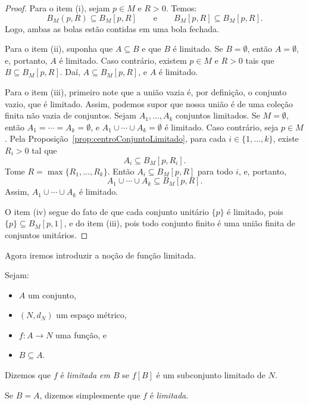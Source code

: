 \begin{proof}
    Para o item (i), sejam $p\in M$ e $R>0$.
    Temos:
    \[
        B_M(p,R)\subseteq B_M[p,R]
        \qquad\text{e}\qquad
        B_M[p,R]\subseteq B_M[p,R].
    \]
    Logo, ambas as bolas estão contidas em uma bola fechada.

    Para o item (ii), suponha que $A\subseteq B$ e que $B$ é limitado.
    Se $B=\emptyset$, então $A=\emptyset$, e, portanto, $A$ é limitado.
    Caso contrário, existem $p\in M$ e $R>0$ tais que $B\subseteq B_M[p,R]$.
    Daí, $A\subseteq B_M[p,R]$, e $A$ é limitado.

    Para o item (iii), primeiro note que a união vazia é, por definição, o conjunto vazio, que é limitado.
    Assim, podemos supor que nossa união é de uma coleção finita não vazia de conjuntos.
    Sejam $A_1, \dots, A_k$ conjuntos limitados.
    Se $M=\emptyset$, então $A_1=\cdots=A_k=\emptyset$, e $A_1\cup\cdots\cup A_k=\emptyset$ é limitado.
    Caso contrário, seja $p\in M$.
    Pela Proposição~\ref{prop:centroConjuntoLimitado}, para cada $i\in\{1,\dots,k\}$, existe $R_i>0$ tal que
    \[
        A_i\subseteq B_M[p,R_i].
    \]
    Tome $R=\max\{R_1,\dots,R_k\}$.
    Então $A_i\subseteq B_M[p,R]$ para todo $i$, e, portanto,
    \[
        A_1\cup\cdots\cup A_k\subseteq B_M[p,R].
    \]
    Assim, $A_1\cup\cdots\cup A_k$ é limitado.

    O item (iv) segue do fato de que cada conjunto unitário $\{p\}$ é limitado, pois $\{p\}\subseteq B_M[p,1]$, e do item (iii), pois todo conjunto finito é uma união finita de conjuntos unitários.
\end{proof}

Agora iremos introduzir a noção de função limitada.

\begin{definition}
    Sejam:
    \begin{itemize}
        \item $A$ um conjunto,
        \item $(N,d_N)$ um espaço métrico,
        \item $f:A\to N$ uma função, e
        \item $B\subseteq A$.
    \end{itemize}

    Dizemos que $f$ é \emph{limitada em $B$} se $f[B]$ é um subconjunto limitado de $N$.

    Se $B=A$, dizemos simplesmente que $f$ é \emph{limitada}.
\end{definition}

